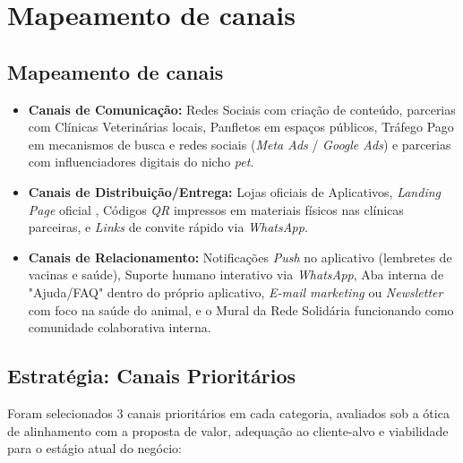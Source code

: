 \section{Mapeamento de canais}


\subsection{Mapeamento de canais}

\begin{itemize}[leftmargin=*]

    \item \textbf{Canais de Comunicação:} Redes Sociais com criação de conteúdo, parcerias com Clínicas Veterinárias locais, Panfletos em espaços públicos, Tráfego Pago em mecanismos de busca e redes sociais (\textit{Meta Ads} / \textit{Google Ads}) e parcerias com influenciadores digitais do nicho \textit{pet}.

    \item \textbf{Canais de Distribuição/Entrega:} Lojas oficiais de Aplicativos, \textit{Landing Page} oficial , Códigos \textit{QR} impressos em materiais físicos nas clínicas parceiras, e \textit{Links} de convite rápido via \textit{WhatsApp}.

    \item \textbf{Canais de Relacionamento:} Notificações \textit{Push} no aplicativo (lembretes de vacinas e saúde), Suporte humano interativo via \textit{WhatsApp}, Aba interna de "Ajuda/FAQ" dentro do próprio aplicativo, \textit{E-mail marketing} ou \textit{Newsletter} com foco na saúde do animal, e o Mural da Rede Solidária funcionando como comunidade colaborativa interna.
\end{itemize}

\subsection{Estratégia: Canais Prioritários}

Foram selecionados 3 canais prioritários em cada categoria, avaliados sob a ótica de alinhamento com a proposta de valor, adequação ao cliente-alvo e viabilidade para o estágio atual do negócio:

